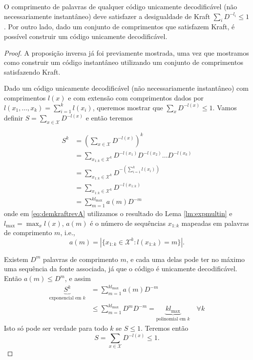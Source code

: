 \begin{theorem}
O comprimento de palavras de qualquer código unicamente decodificável (não necessariamente instantâneo)
deve satisfazer a desigualdade de Kraft $\sum_i D^{-l_i} \leq 1$. Por outro lado, dado um conjunto de comprimentos
que satisfazem Kraft, é possível construir um código unicamente decodificável.
\end{theorem}
\begin{proof}
A proposição inversa já foi previamente mostrada, uma vez que mostramos como construir um código instantâneo
utilizando um conjunto de comprimentos satisfazendo Kraft.

Dado um código unicamente decodificável (não necessariamente instantâneo) com comprimentos $l(x)$
e com extensão com comprimentos dados por $l(x_1, \ldots, x_k) = \sum_{i=1}^k l(x_i)$, queremos mostrar
que $\sum_x D^{-l(x)} \leq 1$.
Vamos definir $S = \sum_{x \in \mathcal{X}} D^{-l(x)}$ e então teremos

\begin{subequations}
  \begin{align}
    S^k &= \left( \sum_{x \in \mathcal{X}} D^{-l(x)} \right)^k \\
        &= \sum_{x_{1:k} \in \mathcal{X}^k} D^{-l(x_1)} D^{-l(x_2)} \ldots D^{-l(x_k)} \label{eq:demkraftrevA}\\
        &= \sum_{x_{1:k} \in \mathcal{X}^k} D^{- \left( \sum_{i=1}^k l(x_i) \right)} \\
        &= \sum_{x_{1:k} \in \mathcal{X}^k} D^{-l(x_{1:k})} \\
        &= \sum_{m=1}^{k l_{\text{max}}} a(m) D^{-m}
  \end{align}
\end{subequations}
onde em \ref{eq:demkraftrevA} utilizamos o resultado do Lema \ref{lm:expmultin} e
$l_{\text{max}} = \max_x l(x)$, $a(m)$ é o número de sequências $x_{1:k}$ mapeadas em palavras de comprimento $m$, 
i.e., 
\begin{equation}
  a(m) = \left\vert \{ x_{1:k} \in \mathcal{X}^k : l(x_{1:k}) = m \} \right\vert .
\end{equation}

Existem $D^m$ palavras de comprimento $m$, e cada uma delas pode ter no máximo uma sequência da fonte associada,
já que o código é unicamente decodificável. Então $a(m) \leq D^m$, e assim
\begin{subequations}
  \begin{align}
    \underbrace{S^k}_{\text{exponencial em } k} &= \sum_{m=1}^{k l_{\text{max}}} a(m) D^{-m} \\
                &\leq \sum_{m=1}^{k l_{\text{max}}} D^m D^{-m} = \underbrace{k l_{\text{max}}}_{\text{polinomial em } k} \quad \forall k
  \end{align}
\end{subequations}
Isto só pode ser verdade para todo $k$ se $S \leq 1$.
Teremos então
\begin{equation}
  S = \sum_{x \in \mathcal{X}} D^{-l(x)} \leq 1 .
\end{equation}
\end{proof}
